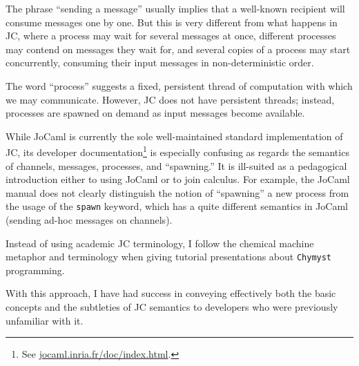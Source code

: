 \documentclass[sigplan,10pt,review,anonymous]{acmart}\settopmatter{printfolios=true}
\begin{document}
The phrase \textquotedblleft sending a message\textquotedblright{}
usually implies that a well-known recipient will consume messages
one by one. But this is very different from what happens in JC, where
a process may wait for several messages at once, different processes
may contend on messages they wait for, and several copies of a process
may start concurrently, consuming their input messages in non-deterministic
order.

The word ``process'' suggests a fixed, persistent thread of computation
with which we may communicate. However, JC does not have persistent
threads; instead, processes are spawned on demand as
input messages become available.

While JoCaml is currently the sole well-maintained standard implementation
of JC, its developer documentation\footnote{ See \href{http://jocaml.inria.fr/doc/index.html}{jocaml.inria.fr/doc/index.html}.}
is especially confusing as regards the semantics of channels, messages,
processes, and ``spawning.'' It is ill-suited as a pedagogical introduction
either to using JoCaml or to join calculus. For example, the JoCaml
manual does not clearly distinguish the notion of ``spawning'' a
new process from the usage of the \texttt{spawn} keyword, which has
a quite different semantics in JoCaml (sending ad-hoc messages on
channels).

Instead of using academic JC terminology, I follow the chemical machine
metaphor and terminology when giving tutorial presentations about
\texttt{Chymyst} programming. %
\begin{comment}
Here is a dictionary:
\begin{center}
\begin{tabular}{|c|c|c|}
\hline 
Academic join calculus & Chemical machine & \texttt{Chymyst} code example\tabularnewline
\hline 
\hline 
message on a channel & input molecule & \texttt{case a(123)} $\Rightarrow$ ...\tabularnewline
\hline 
channel or name & molecule emitter & \texttt{val a: M{[}Int{]}}\tabularnewline
\hline 
synchronous channel & blocking emitter & \texttt{val q: B{[}Unit, Int{]}}\tabularnewline
\hline 
process & reaction & \texttt{go \{ case a(x) + }...\texttt{ }$\Rightarrow$\texttt{ }...\texttt{ \}}\tabularnewline
\hline 
sending a message & emitting a molecule & \texttt{a(123)}\tabularnewline
\hline 
sending a synchronous message & emitting a blocking molecule & \texttt{val x: Int = q()}\tabularnewline
\hline 
join definition & reaction site & \texttt{site(r1, r2, ...)}\tabularnewline
\hline 
\end{tabular}
\par\end{center}
\end{comment}
With this approach, I have had success in conveying effectively both
the basic concepts and the subtleties of JC semantics to developers
who were previously unfamiliar with it.
\end{document}
